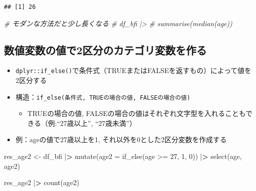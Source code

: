 \documentclass[
  xelatex,ja=standard, b5paper]{bxjsbook}
\newenvironment{Shaded}{\begin{snugshade}}{\end{snugshade}}
\newcommand{\AttributeTok}[1]{\textcolor[rgb]{0.77,0.63,0.00}{#1}}
\newcommand{\CommentTok}[1]{\textcolor[rgb]{0.56,0.35,0.01}{\textit{#1}}}
\newcommand{\DecValTok}[1]{\textcolor[rgb]{0.00,0.00,0.81}{#1}}
\newcommand{\ErrorTok}[1]{\textcolor[rgb]{0.64,0.00,0.00}{\textbf{#1}}}
\newcommand{\FunctionTok}[1]{\textcolor[rgb]{0.00,0.00,0.00}{#1}}
\newcommand{\NormalTok}[1]{#1}
\newcommand{\OtherTok}[1]{\textcolor[rgb]{0.56,0.35,0.01}{#1}}
\newcommand{\SpecialCharTok}[1]{\textcolor[rgb]{0.00,0.00,0.00}{#1}}
\providecommand{\tightlist}{%
  \setlength{\itemsep}{0pt}\setlength{\parskip}{0pt}}
\begin{document}
\begin{Shaded}
\end{Shaded}

\begin{verbatim}
## [1] 26
\end{verbatim}

\begin{Shaded}
\begin{Highlighting}[]
\CommentTok{\# モダンな方法だと少し長くなる}
\CommentTok{\# df\_bfi |\textgreater{} }
\CommentTok{\#   summarise(median(age))}
\end{Highlighting}
\end{Shaded}

\hypertarget{ux6570ux5024ux5909ux6570ux306eux5024ux30672ux533aux5206ux306eux30abux30c6ux30b4ux30eaux5909ux6570ux3092ux4f5cux308b}{%
\subsection{数値変数の値で2区分のカテゴリ変数を作る}\label{ux6570ux5024ux5909ux6570ux306eux5024ux30672ux533aux5206ux306eux30abux30c6ux30b4ux30eaux5909ux6570ux3092ux4f5cux308b}}

\begin{itemize}
\tightlist
\item
  \texttt{dplyr::if\_else()}で条件式（TRUEまたはFALSEを返すもの）によって値を2区分する
\item
  構造：\texttt{if\_else(条件式,\ TRUEの場合の値,\ FALSEの場合の値)}

  \begin{itemize}
  \tightlist
  \item
    TRUEの場合の値, FALSEの場合の値はそれぞれ文字型を入れることもできる（例:``27歳以上'', ``27歳未満''）
  \end{itemize}
\item
  例：ageの値で27歳以上を1, それ以外を0とした2区分変数を作成する
\end{itemize}

\begin{Shaded}
\begin{Highlighting}[]
\NormalTok{res\_age2 }\OtherTok{\textless{}{-}} 
\NormalTok{  df\_bfi }\SpecialCharTok{|}\ErrorTok{\textgreater{}} 
  \FunctionTok{mutate}\NormalTok{(}\AttributeTok{age2 =} \FunctionTok{if\_else}\NormalTok{(age }\SpecialCharTok{\textgreater{}=} \DecValTok{27}\NormalTok{, }\DecValTok{1}\NormalTok{, }\DecValTok{0}\NormalTok{)) }\SpecialCharTok{|}\ErrorTok{\textgreater{}} 
  \FunctionTok{select}\NormalTok{(age, age2)}

\NormalTok{res\_age2 }\SpecialCharTok{|}\ErrorTok{\textgreater{}} \FunctionTok{count}\NormalTok{(age2) }
\end{Highlighting}
\end{Shaded}
\end{document}
